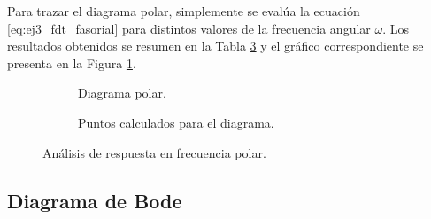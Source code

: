 Para trazar el diagrama polar, simplemente se evalúa la ecuación \ref{eq:ej3_fdt_fasorial} para distintos valores de la frecuencia angular $\omega$. Los resultados obtenidos se resumen en la Tabla \ref{tab:ej3_puntos_polar} y el gráfico correspondiente se presenta en la Figura \ref{fig:ej3_polar}.

\begin{figure}[!ht]
    \centering
    \begin{subfigure}[c]{0.45\textwidth}
        \centering
        \resizebox{\textwidth}{!}{
            
        }
        \caption{Diagrama polar.}
        \label{fig:ej3_polar}
    \end{subfigure}
    \hfill
    \begin{subfigure}[c]{0.45\textwidth}
        \centering
        \caption{Puntos calculados para el diagrama.}
        \label{tab:ej3_puntos_polar}
    \end{subfigure}
    \caption{Análisis de respuesta en frecuencia polar.}
\end{figure}

\subsection{Diagrama de Bode}

